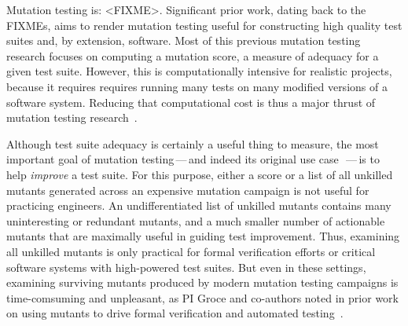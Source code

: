Mutation testing is: <FIXME>.  Significant prior work, dating back to the
FIXMEs, aims to render mutation testing useful for constructing high quality
test suites and, by extension, software. 
Most of this previous mutation testing
research focuses on computing a mutation score, a measure of adequacy for a
given test suite.  However, this is computationally intensive for realistic
projects, because it requires requires running many tests on many modified
versions of a software system.  Reducing that computational cost is thus a major
thrust of mutation testing research~\cite{jia2011analysis}.   

Although test suite adequacy is certainly a useful thing to measure, the most
important goal of mutation testing\,---\,and indeed its original use
case~\cite{something}\,---\,is to help \emph{improve} a test suite.  For this
purpose, either a score or a list of all unkilled mutants generated across an
expensive mutation campaign is not useful for practicing engineers.  An
undifferentiated list of unkilled mutants contains many uninteresting or
redundant mutants, and a much smaller number of actionable mutants that are
maximally useful in guiding test improvement.  Thus, examining all unkilled
mutants is only practical for formal verification efforts or critical software
systems with high-powered test suites.  But even in these settings, examining
surviving mutants produced by modern mutation testing campaigns is
time-comsuming and unpleasant, as PI Groce and co-authors noted in prior work on
using mutants to drive formal verification and automated
testing~\cite{groce2015verified,groce2018verified,mutKernel}.


